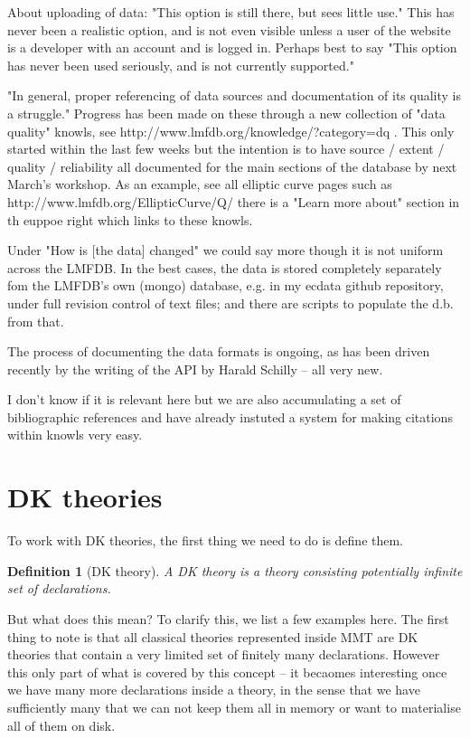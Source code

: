 \documentclass{deliverablereport}
\newtheorem{mydef}{Definition}
\begin{document}
About uploading of data: "This option is still there, but sees little
use."  This has never been a realistic option, and is not even visible
unless a user of the website is a developer with an account and is logged
in.  Perhaps best to say "This option has never been used seriously, and is
not currently supported."

"In general, proper referencing of data sources and documentation of its
quality is a struggle."   Progress has been made on these through a new
collection of "data quality" knowls, see
http://www.lmfdb.org/knowledge/?category=dq .  This only started within the
last few weeks but the intention is to have source / extent / quality /
reliability all documented for the main sections of the database by next
March's workshop.  As an example, see all elliptic curve pages such as
http://www.lmfdb.org/EllipticCurve/Q/  there is a "Learn more about"
section in th euppoe right which links to these knowls.

Under "How is [the data] changed" we could say more though it is not
uniform across the LMFDB.  In the best cases, the data is stored completely
separately fom the LMFDB's own (mongo) database, e.g. in my ecdata github
repository, under full revision control of text files;  and there are
scripts to populate the d.b. from that.

The process of documenting the data formats is ongoing, as has been driven
recently by the writing of the API by Harald Schilly -- all very new.

I don't know if it is relevant here but we are also accumulating a set of
bibliographic references and have already instuted a system for making
citations within knowls very easy.

\section{DK theories}\label{sec:data}

To work with DK theories, the first thing we need to do is define them.
\begin{mydef}[DK theory]
  A DK theory is a theory consisting potentially infinite set of declarations.
\end{mydef}

But what does this mean? To clarify this, we list a few examples here. The first thing to note is that all classical theories represented inside MMT are DK theories that contain a very limited set of finitely many declarations. However this only part of what is covered by this concept -- it becaomes interesting once we have many more declarations inside a theory, in the sense that we have sufficiently many that we can not keep them all in memory or want to materialise all of them on disk.
\end{document}
